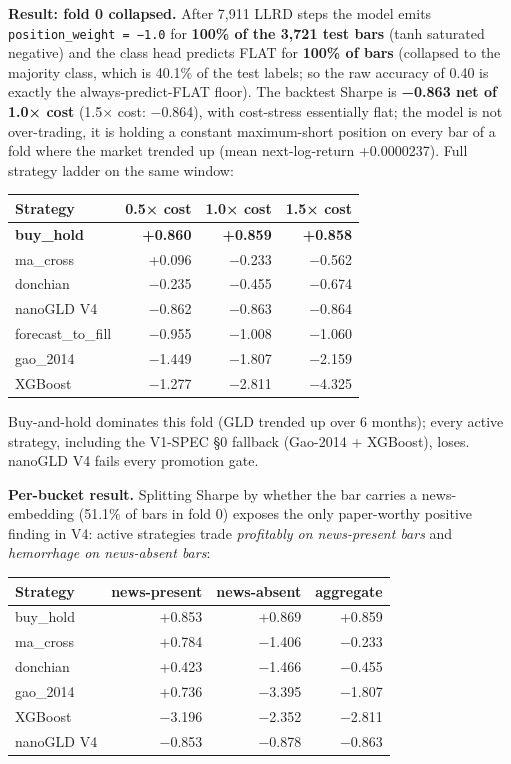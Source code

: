 \documentclass[
]{article}
\newcounter{none} %
\begin{document}
\textbf{Result: fold 0 collapsed.} After 7,911 LLRD steps the model
emits \texttt{position\_weight\ =\ −1.0} for \textbf{100\% of the 3,721
test bars} (tanh saturated negative) and the class head predicts FLAT
for \textbf{100\% of bars} (collapsed to the majority class, which is
40.1\% of the test labels; so the raw accuracy of 0.40 is exactly the
always-predict-FLAT floor). The backtest Sharpe is \textbf{−0.863 net of
1.0× cost} (1.5× cost: −0.864), with cost-stress essentially flat; the
model is not over-trading, it is holding a constant maximum-short
position on every bar of a fold where the market trended up (mean
next-log-return +0.0000237). Full strategy ladder on the same window:

{\def\LTcaptype{none} %
\begin{longtable}[]{@{}lrrr@{}}
\toprule\noalign{}
Strategy & 0.5× cost & 1.0× cost & 1.5× cost \\
\midrule\noalign{}
\endhead
\bottomrule\noalign{}
\endlastfoot
\textbf{buy\_hold} & \textbf{+0.860} & \textbf{+0.859} &
\textbf{+0.858} \\
ma\_cross & +0.096 & −0.233 & −0.562 \\
donchian & −0.235 & −0.455 & −0.674 \\
nanoGLD V4 & −0.862 & −0.863 & −0.864 \\
forecast\_to\_fill & −0.955 & −1.008 & −1.060 \\
gao\_2014 & −1.449 & −1.807 & −2.159 \\
XGBoost & −1.277 & −2.811 & −4.325 \\
\end{longtable}
}

Buy-and-hold dominates this fold (GLD trended up over 6 months); every
active strategy, including the V1-SPEC §0 fallback (Gao-2014 + XGBoost),
loses. nanoGLD V4 fails every promotion gate.

\textbf{Per-bucket result.} Splitting Sharpe by whether the bar carries
a news-embedding (51.1\% of bars in fold 0) exposes the only
paper-worthy positive finding in V4: active strategies trade
\emph{profitably on news-present bars} and \emph{hemorrhage on
news-absent bars}:

{\def\LTcaptype{none} %
\begin{longtable}[]{@{}lrrr@{}}
\toprule\noalign{}
Strategy & news-present & news-absent & aggregate \\
\midrule\noalign{}
\endhead
\bottomrule\noalign{}
\endlastfoot
buy\_hold & +0.853 & +0.869 & +0.859 \\
ma\_cross & +0.784 & −1.406 & −0.233 \\
donchian & +0.423 & −1.466 & −0.455 \\
gao\_2014 & +0.736 & −3.395 & −1.807 \\
XGBoost & −3.196 & −2.352 & −2.811 \\
nanoGLD V4 & −0.853 & −0.878 & −0.863 \\
\end{longtable}
}
\end{document}
